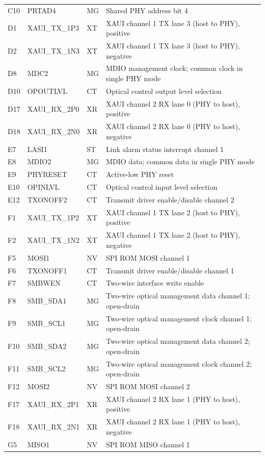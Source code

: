 \documentclass[10pt,a4paper]{article}
\begin{document}
\begin{longtable}{@{}p{12mm}p{44mm}p{10mm}p{91mm}@{}}
C10 & PRTAD4 & MG & Shared PHY address bit 4\\
D1 & XAUI\_TX\_1P3 & XT & XAUI channel 1 TX lane 3 (host to PHY), positive\\
D2 & XAUI\_TX\_1N3 & XT & XAUI channel 1 TX lane 3 (host to PHY), negative\\
D8 & MDC2 & MG & MDIO management clock; common clock in single PHY mode\\
D10 & OPOUTLVL & CT & Optical control output level selection\\
D17 & XAUI\_RX\_2P0 & XR & XAUI channel 2 RX lane 0 (PHY to host), positive\\
D18 & XAUI\_RX\_2N0 & XR & XAUI channel 2 RX lane 0 (PHY to host), negative\\
E7 & LASI1 & ST & Link alarm status interrupt channel 1\\
E8 & MDIO2 & MG & MDIO data; common data in single PHY mode\\
E9 & PHYRESET & CT & Active-low PHY reset\\
E10 & OPINLVL & CT & Optical control input level selection\\
E12 & TXONOFF2 & CT & Transmit driver enable/disable channel 2\\
F1 & XAUI\_TX\_1P2 & XT & XAUI channel 1 TX lane 2 (host to PHY), positive\\
F2 & XAUI\_TX\_1N2 & XT & XAUI channel 1 TX lane 2 (host to PHY), negative\\
F5 & MOSI1 & NV & SPI ROM MOSI channel 1\\
F6 & TXONOFF1 & CT & Transmit driver enable/disable channel 1\\
F7 & SMBWEN & CT & Two-wire interface write enable\\
F8 & SMB\_SDA1 & MG & Two-wire optical management data channel 1; open-drain\\
F9 & SMB\_SCL1 & MG & Two-wire optical management clock channel 1; open-drain\\
F10 & SMB\_SDA2 & MG & Two-wire optical management data channel 2; open-drain\\
F11 & SMB\_SCL2 & MG & Two-wire optical management clock channel 2; open-drain\\
F12 & MOSI2 & NV & SPI ROM MOSI channel 2\\
F17 & XAUI\_RX\_2P1 & XR & XAUI channel 2 RX lane 1 (PHY to host), positive\\
F18 & XAUI\_RX\_2N1 & XR & XAUI channel 2 RX lane 1 (PHY to host), negative\\
G5 & MISO1 & NV & SPI ROM MISO channel 1\\

\end{longtable}
\end{document}
